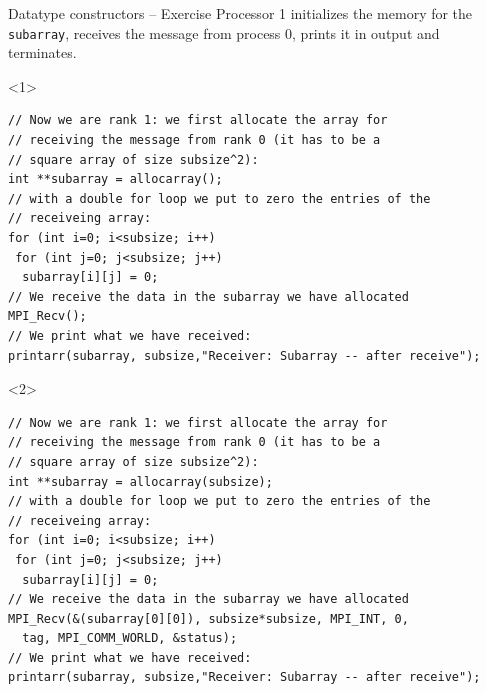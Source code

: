 \documentclass[xcolor={svgnames,usenames}]{beamer}
\begin{document}
\begin{frame}[fragile]{Datatype constructors -- Exercise}
\small\vspace{-1em}
Processor 1 initializes the memory for the \texttt{subarray}, receives the message from process 0, prints it in output and terminates.
\begin{onlyenv}<1>
\begin{verbatim}
// Now we are rank 1: we first allocate the array for 
// receiving the message from rank 0 (it has to be a 
// square array of size subsize^2):
int **subarray = allocarray();
// with a double for loop we put to zero the entries of the 
// receiveing array:
for (int i=0; i<subsize; i++)
 for (int j=0; j<subsize; j++)
  subarray[i][j] = 0;
// We receive the data in the subarray we have allocated
MPI_Recv();
// We print what we have received:
printarr(subarray, subsize,"Receiver: Subarray -- after receive");
\end{verbatim}
\end{onlyenv}
\begin{onlyenv}<2>
\begin{verbatim}
// Now we are rank 1: we first allocate the array for 
// receiving the message from rank 0 (it has to be a 
// square array of size subsize^2):
int **subarray = allocarray(subsize);
// with a double for loop we put to zero the entries of the 
// receiveing array:
for (int i=0; i<subsize; i++)
 for (int j=0; j<subsize; j++)
  subarray[i][j] = 0;
// We receive the data in the subarray we have allocated
MPI_Recv(&(subarray[0][0]), subsize*subsize, MPI_INT, 0, 
  tag, MPI_COMM_WORLD, &status);
// We print what we have received:
printarr(subarray, subsize,"Receiver: Subarray -- after receive");
\end{verbatim}
\end{onlyenv}	
\end{frame}
\end{document}
